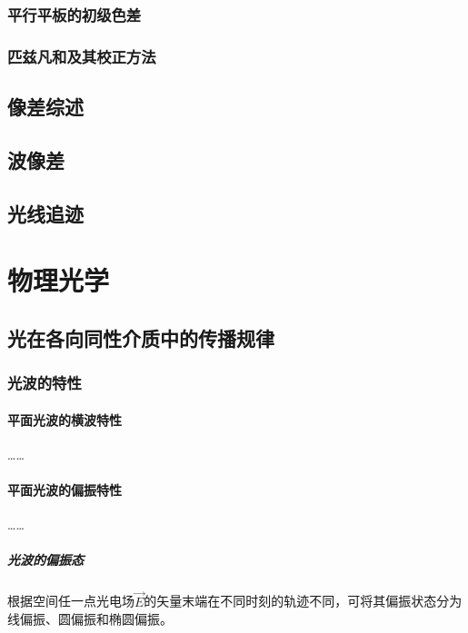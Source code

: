 \documentclass[cn,10pt,chinesefont=founder,math=mtpro2,cite=super,toc=onecol,twoside,openany]{elegantbook}
\begin{document}
\section{平行平板的初级色差}

\section{匹兹凡和及其校正方法}

\chapter{像差综述}

\chapter{波像差}

\chapter{光线追迹}








\part{物理光学}

\chapter{光在各向同性介质中的传播规律}
\section{光波的特性}
\subsection{平面光波的横波特性}
……
\subsection{平面光波的偏振特性}
……
\subsubsection{光波的偏振态}
根据空间任一点光电场$\vec E$的矢量末端在不同时刻的轨迹不同，可将其偏振状态分为线偏振、圆偏振和椭圆偏振。
\end{document}
